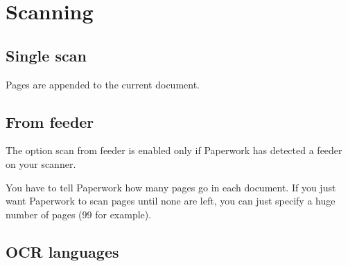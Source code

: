 \documentclass[10pt,a4paper]{article}
\begin{document}
\section{Scanning}

\subsection{Single scan}


Pages are appended to the current document.

\subsection{\label{subsec:From-feeder}From feeder}


The option scan from feeder is enabled
only if Paperwork has detected a feeder on your scanner.

You have to tell Paperwork how many pages go in each document. If
you just want Paperwork to scan pages until none are left, you can
just specify a huge number of pages (99 for example).



\subsection{OCR languages}
\end{document}
